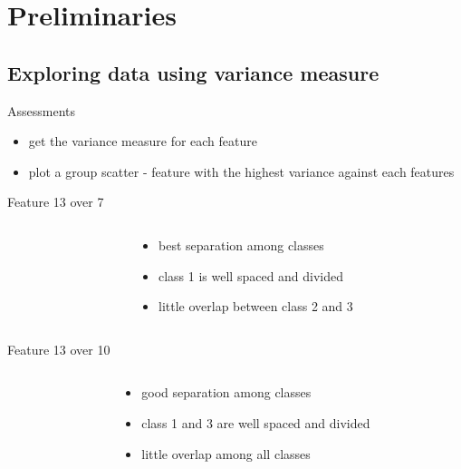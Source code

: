 \documentclass{beamer}
\begin{document}

\section{Preliminaries}

\subsection{Exploring data using variance measure}

\begin{frame}{Assessments}
  \begin{itemize}
  \item{
    get the variance measure for each feature 
    }
  \item{
    plot a group scatter - feature with the highest variance against each features
  }
  \end{itemize}
\end{frame}

\begin{frame}{Feature 13 over 7}
\begin{columns}[t]
\begin{column}{.5\textwidth}
\end{column}
\begin{column}{.5\textwidth}
\begin{itemize}
  \item{
    best separation among classes 
    }
  \item{
    class 1 is well spaced and divided
  }
  \item{
    little overlap between class 2 and 3
  }
  \end{itemize}
\end{column}
\end{columns}
\end{frame}

\begin{frame}{Feature 13 over 10}
\begin{columns}[t]
\begin{column}{.5\textwidth}
\end{column}
\begin{column}{.5\textwidth}
\begin{itemize}
  \item{
    good separation among classes 
    }
  \item{
    class 1 and 3 are well spaced and divided
  }
  \item{
    little overlap among all classes
  }
  \end{itemize}
\end{column}
\end{columns}
\end{frame}
\end{document}
